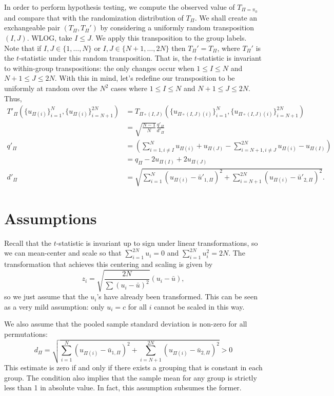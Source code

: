 In order to perform hypothesis testing, we compute the observed value
of $T_{\Pi=\pi_0}$ and compare that with the randomization
distribution of $T_{\Pi}$.  We shall create an exchangeable pair
$(T_{\Pi}, T_{\Pi}')$ by considering a uniformly random transposition
$(I, J)$.  WLOG, take $I \leq J$.  We apply this transposition to the
group labels.  Note that if $I, J \in \{1,\ldots,N\}$ or $I, J \in
\{N+1,\ldots,2N\}$ then $T_{\Pi}' = T_{\Pi}$, where $T_{\Pi}'$ is the
$t$-statistic under this random transposition.  That is, the
$t$-statistic is invariant to within-group transpositions: the only
changes occur when $1 \leq I \leq N$ and $N + 1 \leq J \leq 2N$.  With
this in mind, let's redefine our transposition to be uniformly at
random over the $N^2$ cases where $1 \leq I \leq N$ and $N + 1 \leq J
\leq 2N$. Thus,
\begin{align*}
  T'_{\Pi}(\{u_{\Pi(i)}\}_{i=1}^N, \{u_{\Pi(i)}\}_{i=N+1}^{2N})
  &= T_{\Pi \circ (I,J)}(\{u_{\Pi \circ (I,J)(i)}\}_{i=1}^N, \{u_{\Pi \circ (I,J)(i)}\}_{i=N+1}^{2N}) \\
  &= \sqrt{\frac{N-1}{N}}\frac{q'_{\Pi}}{d'_{\Pi}} \\
  q'_{\Pi} &= \left (\sum_{i=1, i\neq I}^N u_{\Pi(i)} + u_{\Pi(J)} -
    \sum_{i=N+1, i\neq J}^{2N}u_{\Pi(i)} - u_{\Pi(I)} \right ) \\
  &= q_{\Pi} - 2u_{\Pi(I)} + 2u_{\Pi(J)} \\
  d'_{\Pi} &= \sqrt{\sum_{i=1}^N(u_{\Pi(i)} - \bar{u}'_{1, \Pi})^{2} +
    \sum_{i=N+1}^{2N}(u_{\Pi(i)} - \bar{u}'_{2, \Pi})^{2}}.
\end{align*}

\section{Assumptions}
Recall that the $t$-statistic is invariant up to sign under linear
transformations, so we can mean-center and scale so that
$\sum_{i=1}^{2N} u_{i} = 0$ and $\sum_{i=1}^{2N} u_{i}^2 = 2N$.  The
transformation that achieves this centering and scaling is given by
\begin{equation}
  z_i = \sqrt{\frac{2N}{\sum (u_{i} - \bar{u})^2}}(u_{i}-\bar{u}),
\end{equation}
so we just assume that the $u_{i}$'s have already been transformed.
This can be seen as a very mild assumption: only $u_i = c$ for all $i$
cannot be scaled in this way.

We also assume that the pooled sample standard deviation is non-zero
for all permutations:
\begin{equation}
  \label{A:non-zero-std-dev}
  d_\Pi = \sqrt{\sum_{i=1}^N(u_{\Pi(i)} - \bar{u}_{1,\Pi})^2 +
    \sum_{i=N+1}^{2N}(u_{\Pi(i)} - \bar{u}_{2,\Pi})^2} > 0
\end{equation}
This estimate is zero if and only if there exists a grouping that is
constant in each group.  The condition also implies that the sample
mean for any group is strictly less than 1 in absolute value.  In
fact, this assumption subsumes the former.

